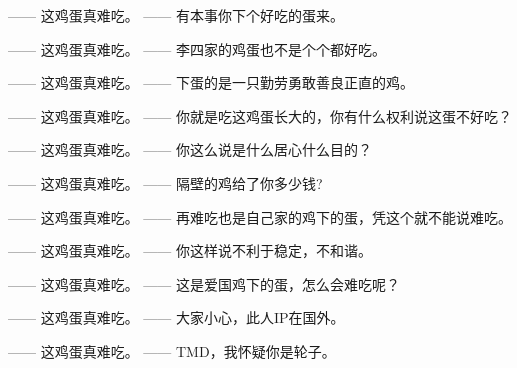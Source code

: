 —— 这鸡蛋真难吃。
—— 有本事你下个好吃的蛋来。

—— 这鸡蛋真难吃。
—— 李四家的鸡蛋也不是个个都好吃。

—— 这鸡蛋真难吃。
—— 下蛋的是一只勤劳勇敢善良正直的鸡。

—— 这鸡蛋真难吃。
—— 你就是吃这鸡蛋长大的，你有什么权利说这蛋不好吃？

—— 这鸡蛋真难吃。
—— 你这么说是什么居心什么目的？

—— 这鸡蛋真难吃。
—— 隔壁的鸡给了你多少钱?

—— 这鸡蛋真难吃。
—— 再难吃也是自己家的鸡下的蛋，凭这个就不能说难吃。

—— 这鸡蛋真难吃。
—— 你这样说不利于稳定，不和谐。

—— 这鸡蛋真难吃。
—— 这是爱国鸡下的蛋，怎么会难吃呢？

—— 这鸡蛋真难吃。
—— 大家小心，此人IP在国外。

—— 这鸡蛋真难吃。
—— TMD，我怀疑你是轮子。

\phantom{x}
